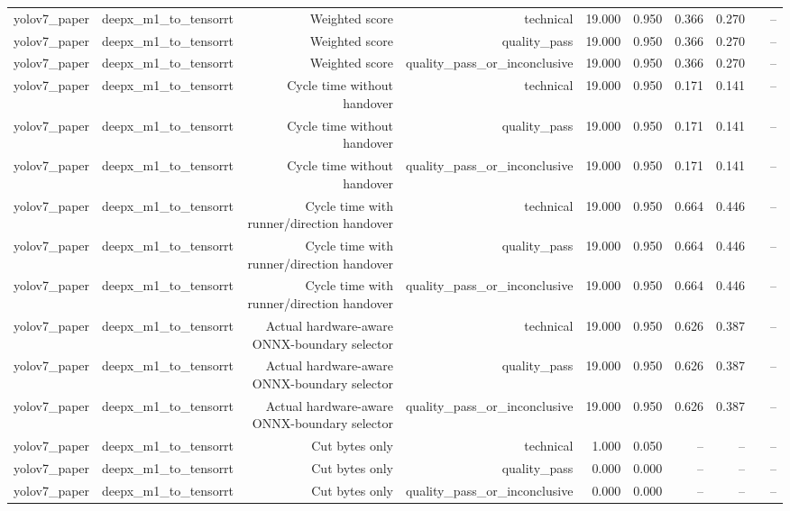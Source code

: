 \begin{table}[t]
\begin{tabular}{lrrrrrrrrr}
yolov7\_paper & deepx\_m1\_to\_tensorrt & Weighted score & technical & 19.000 & 0.950 & 0.366 & 0.270 &  & -- \\
yolov7\_paper & deepx\_m1\_to\_tensorrt & Weighted score & quality\_pass & 19.000 & 0.950 & 0.366 & 0.270 &  & -- \\
yolov7\_paper & deepx\_m1\_to\_tensorrt & Weighted score & quality\_pass\_or\_inconclusive & 19.000 & 0.950 & 0.366 & 0.270 &  & -- \\
yolov7\_paper & deepx\_m1\_to\_tensorrt & Cycle time without handover & technical & 19.000 & 0.950 & 0.171 & 0.141 &  & -- \\
yolov7\_paper & deepx\_m1\_to\_tensorrt & Cycle time without handover & quality\_pass & 19.000 & 0.950 & 0.171 & 0.141 &  & -- \\
yolov7\_paper & deepx\_m1\_to\_tensorrt & Cycle time without handover & quality\_pass\_or\_inconclusive & 19.000 & 0.950 & 0.171 & 0.141 &  & -- \\
yolov7\_paper & deepx\_m1\_to\_tensorrt & Cycle time with runner/direction handover & technical & 19.000 & 0.950 & 0.664 & 0.446 &  & -- \\
yolov7\_paper & deepx\_m1\_to\_tensorrt & Cycle time with runner/direction handover & quality\_pass & 19.000 & 0.950 & 0.664 & 0.446 &  & -- \\
yolov7\_paper & deepx\_m1\_to\_tensorrt & Cycle time with runner/direction handover & quality\_pass\_or\_inconclusive & 19.000 & 0.950 & 0.664 & 0.446 &  & -- \\
yolov7\_paper & deepx\_m1\_to\_tensorrt & Actual hardware-aware ONNX-boundary selector & technical & 19.000 & 0.950 & 0.626 & 0.387 &  & -- \\
yolov7\_paper & deepx\_m1\_to\_tensorrt & Actual hardware-aware ONNX-boundary selector & quality\_pass & 19.000 & 0.950 & 0.626 & 0.387 &  & -- \\
yolov7\_paper & deepx\_m1\_to\_tensorrt & Actual hardware-aware ONNX-boundary selector & quality\_pass\_or\_inconclusive & 19.000 & 0.950 & 0.626 & 0.387 &  & -- \\
yolov7\_paper & deepx\_m1\_to\_tensorrt & Cut bytes only & technical & 1.000 & 0.050 & -- & -- &  & -- \\
yolov7\_paper & deepx\_m1\_to\_tensorrt & Cut bytes only & quality\_pass & 0.000 & 0.000 & -- & -- &  & -- \\
yolov7\_paper & deepx\_m1\_to\_tensorrt & Cut bytes only & quality\_pass\_or\_inconclusive & 0.000 & 0.000 & -- & -- &  & -- \\

\end{tabular}
\end{table}

